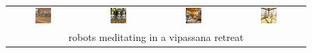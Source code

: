 \begin{figure}[ht!]
\begin{tabular}{cccc}
        \includegraphics[width=0.24\textwidth]{figures/cross/robot_0.jpg} &
        \includegraphics[width=0.24\textwidth]{figures/cross/robot_1.jpg} &
        \includegraphics[width=0.24\textwidth]{figures/cross/robot_2.jpg} &
        \includegraphics[width=0.24\textwidth]{figures/cross/robot_3.jpg} \vspace{-1mm}\\
        \multicolumn{4}{c}{\small robots meditating in a vipassana retreat}\\
        

\end{tabular}
\end{figure}
